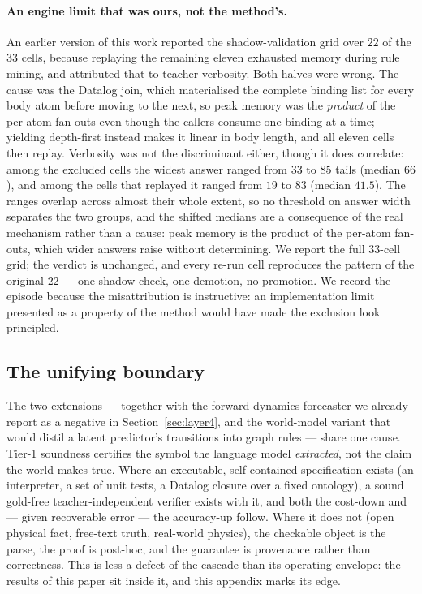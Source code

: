 \documentclass[11pt]{article}
\theoremstyle{plain}
\begin{document}
\paragraph{An engine limit that was ours, not the method's.} An earlier version of
this work reported the shadow-validation grid over $22$ of the $33$ cells, because
replaying the remaining eleven exhausted memory during rule mining, and attributed
that to teacher verbosity. Both halves were wrong. The cause was the Datalog join,
which materialised the complete binding list for every body atom before moving to
the next, so peak memory was the \emph{product} of the per-atom fan-outs even
though the callers consume one binding at a time; yielding depth-first instead
makes it linear in body length, and all eleven cells then replay. Verbosity was
not the discriminant either, though it does correlate: among the excluded cells
the widest answer ranged from $33$ to $85$ tails (median $66$), and among the
cells that replayed it ranged from $19$ to $83$ (median $41.5$). The ranges
overlap across almost their whole extent, so no threshold on answer width
separates the two groups, and the shifted medians are a consequence of the real
mechanism rather than a cause: peak memory is the product of the per-atom
fan-outs, which wider answers raise without determining.
We report the full $33$-cell grid; the
verdict is unchanged, and every re-run cell reproduces the pattern of the original
$22$ --- one shadow check, one demotion, no promotion. We record the episode
because the misattribution is instructive: an implementation limit presented as a
property of the method would have made the exclusion look principled.

\subsection{The unifying boundary}
The two extensions --- together with the forward-dynamics forecaster we
already report as a negative in Section~\ref{sec:layer4}, and the
world-model variant that would distil a latent predictor's transitions
into graph rules \citep{zhou2025walle2,liu2026gwmtaxonomy} --- share one
cause. Tier-1
soundness certifies the symbol the language model \emph{extracted}, not
the claim the world makes true. Where an executable, self-contained
specification exists (an interpreter, a set of unit tests, a Datalog
closure over a fixed ontology), a sound gold-free teacher-independent
verifier exists with it, and both the cost-down and --- given recoverable
error --- the accuracy-up follow. Where it does not (open physical fact,
free-text truth, real-world physics), the checkable object is the parse,
the proof is post-hoc, and the guarantee is provenance rather than
correctness. This is less a defect of the cascade than its operating
envelope: the results of this paper sit inside it, and this appendix marks
its edge.


\end{document}
